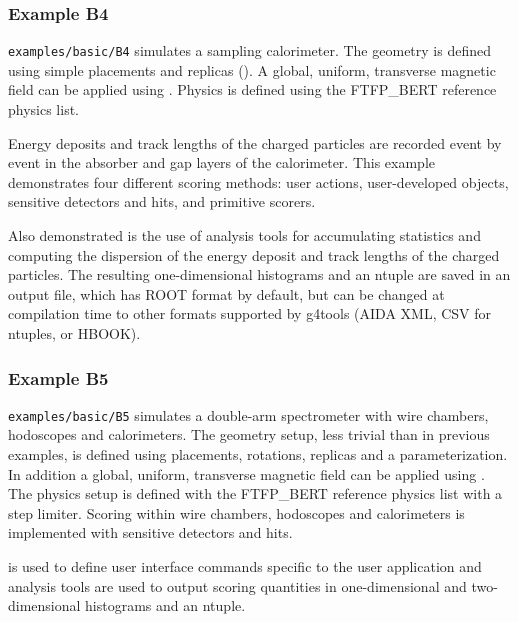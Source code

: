 \subsubsection{Example B4}
\verb"examples/basic/B4" simulates a sampling calorimeter.  The geometry is 
defined using simple placements and replicas ().  A global,
uniform, transverse magnetic field can be applied using 
.
Physics is defined using the FTFP\_BERT reference physics list.

Energy deposits and track lengths of the charged particles are recorded event
by event in the absorber and gap layers of the calorimeter.  This example 
demonstrates four different scoring methods: user actions, user-developed 
objects, sensitive detectors and hits, and primitive scorers.

Also demonstrated is the use of \Gfour{} analysis tools for accumulating
statistics and computing the dispersion of the energy deposit and track lengths 
of the charged particles.  The resulting one-dimensional histograms and an 
ntuple are saved in an output file, which has ROOT format by default, but can
be changed at compilation time to other formats supported by g4tools (AIDA XML,
CSV for ntuples, or HBOOK). 

\subsubsection{Example B5}
\verb"examples/basic/B5" simulates a double-arm spectrometer with wire chambers,
hodoscopes and calorimeters. The geometry setup, less trivial than in previous 
examples, is defined using placements, rotations, replicas and a parameterization.
In addition a global, uniform, transverse magnetic field can be applied using 
.  The physics setup is defined with the 
FTFP\_BERT reference physics list with a step limiter.  Scoring within wire 
chambers, hodoscopes and calorimeters is implemented with sensitive detectors 
and hits. 

 is used to define user interface commands specific 
to the user application and \Gfour{} analysis tools are used to output scoring
quantities in one-dimensional and two-dimensional histograms and an ntuple. 
